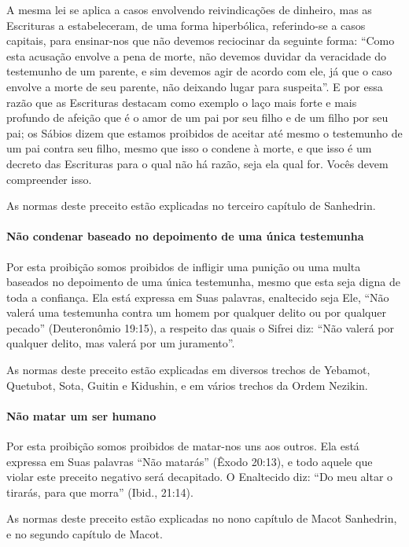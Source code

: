 A mesma lei se aplica a casos envolvendo reivindicações de dinheiro,
mas as Escrituras a estabeleceram, de uma forma hiperbólica,
referindo-se a casos capitais, para ensinar-nos que não devemos
reciocinar da seguinte forma: ``Como esta acusação envolve a pena de
morte, não devemos duvidar da veracidade do testemunho de um parente, e
sim devemos agir de acordo com ele, já que o caso envolve a morte de seu
parente, não deixando lugar para suspeita''. E por essa razão que as
Escrituras destacam como exemplo o laço mais forte e mais profundo de
afeição que é o amor de um pai por seu filho e de um filho por seu pai;
os Sábios dizem que estamos proibidos de aceitar até mesmo o testemunho
de um pai contra seu filho, mesmo que isso o condene à morte, e que isso
é um decreto das Escrituras para o qual não há razão, seja ela qual for.
Vocês devem compreender isso.

As normas deste preceito estão explicadas no terceiro capítulo de Sanhedrin.

\paragraph{Não condenar baseado no depoimento de uma única testemunha}

Por esta proibição somos proibidos de infligir uma punição ou uma multa
baseados no depoimento de uma única testemunha, mesmo que esta seja
digna de toda a confiança. Ela está expressa em Suas palavras,
enaltecido seja Ele, ``Não valerá uma testemunha contra um homem por
qualquer delito ou por qualquer pecado'' (Deuteronômio 19:15), a
respeito das quais o Sifrei diz: ``Não valerá por qualquer delito, mas
valerá por um juramento''.

As normas deste preceito estão explicadas em diversos trechos de
Yebamot, Quetubot, Sota, Guitin e Kidushin, e em vários trechos da Ordem
Nezikin.

\paragraph{Não matar um ser humano}

Por esta proibição somos proibidos de matar-nos uns aos
outros. Ela está expressa em Suas palavras ``Não matarás'' (Êxodo
20:13), e todo aquele que violar este preceito negativo será decapitado.
O Enaltecido diz: ``Do meu altar o tirarás, para que morra'' (Ibid., 21:14).

As normas deste preceito estão explicadas no nono capítulo de Macot
Sanhedrin, e no segundo capítulo de Macot.


